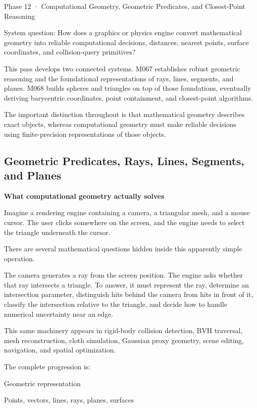 Phase 12 · Computational Geometry, Geometric Predicates, and Closest-Point Reasoning

System question: How does a graphics or physics engine convert mathematical geometry into reliable computational decisions, distances, nearest points, surface coordinates, and collision-query primitives?

This pass develops two connected systems. M067 establishes robust geometric reasoning and the foundational representations of rays, lines, segments, and planes. M068 builds spheres and triangles on top of those foundations, eventually deriving barycentric coordinates, point containment, and closest-point algorithms.

The important distinction throughout is that mathematical geometry describes exact objects, whereas computational geometry must make reliable decisions using finite-precision representations of those objects.

\subsection{Geometric Predicates, Rays, Lines, Segments, and Planes}\label{03-visual-computing-i-ch020-geometric-predicates-rays-lines-segments-and-planes}

\textbf{What computational geometry actually solves}

Imagine a rendering engine containing a camera, a triangular mesh, and a mouse cursor. The user clicks somewhere on the screen, and the engine needs to select the triangle underneath the cursor.

There are several mathematical questions hidden inside this apparently simple operation.

The camera generates a ray from the screen position. The engine asks whether that ray intersects a triangle. To answer, it must represent the ray, determine an intersection parameter, distinguish hits behind the camera from hits in front of it, classify the intersection relative to the triangle, and decide how to handle numerical uncertainty near an edge.

This same machinery appears in rigid-body collision detection, BVH traversal, mesh reconstruction, cloth simulation, Gaussian proxy geometry, scene editing, navigation, and spatial optimization.

The complete progression is:

Geometric representation

Points, vectors, lines, rays, planes, surfaces

